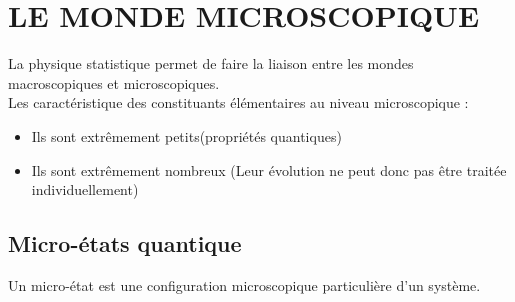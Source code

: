 \documentclass[12pt,oneside]{book}
\begin{document}
\chapter{LE MONDE MICROSCOPIQUE}
La physique statistique permet de faire la liaison entre les mondes macroscopiques et microscopiques.\\
Les caractéristique des constituants élémentaires au niveau microscopique :
\begin{itemize}
	\item Ils sont extrêmement petits(propriétés quantiques)
	\item Ils sont extrêmement nombreux (Leur évolution ne peut donc pas être traitée individuellement)
\end{itemize}
\section{Micro-états quantique}
Un micro-état est une configuration microscopique particulière d'un système.
\end{document}
